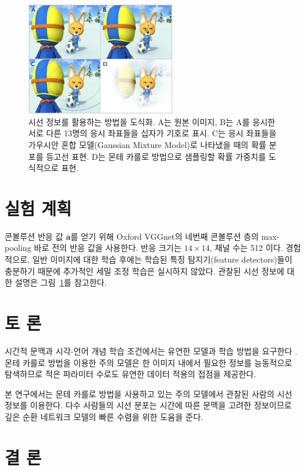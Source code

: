 \documentclass{kcc}
\newcommand{\sa}[0]{\mathbf{a}}
\begin{document}
\begin{figure}
  \centerline{\includegraphics[width=65mm,height=49mm]{eps/sel_fig2.png}}
  \caption{시선 정보를 활용하는 방법을 도식화. A는 원본 이미지, B는 A를 응시한 서로 다른 13명의 응시 좌표들을 십자가 기호로 표시. C는 응시 좌표들을 가우시안 혼합 모델(Gaussian Mixture Model)로 나타냈을 때의 확률 분포를 등고선 표현. D는 몬테 카를로 방법으로 샘플링할 확률 가중치를 도식적으로 표현.}
  \label{fig:selective}
\end{figure}

\section{실험 계획}

콘볼루션 반응 값 $\sa$를 얻기 위해 Oxford VGGnet\cite{Simonyan2014}의 네번째 콘볼루션 층의 max-pooling 바로 전의 반응 값을 사용한다. 반응 크기는 $14 \times 14$, 채널 수는 512 이다. 경험적으로, 일반 이미지에 대한 학습 후에는 학습된 특징 탐지기(feature detectors)들이 충분하기 때문에 추가적인 세밀 조정 학습은 실시하지 않았다. 관찰된 시선 정보에 대한 설명은 그림~\ref{fig:selective}를 참고한다.

\section{토 론}

시간적 문맥과 시각-언어 개념 학습 조건에서는 유연한 모델과 학습 방법을 요구한다 \cite{zhang1994incremental}. 몬테 카를로 방법을 이용한 주의 모델은 한 이미지 내에서 필요한 정보를 능동적으로 탐색하므로 적은 파라미터 수로도 유연한 데이터 적용의 접점을 제공한다.

본 연구에서는 몬테 카를로 방법을 사용하고 있는 주의 모델에서 관찰된 사람의 시선 정보를 이용한다. 다수 사람들의 시선 분포는 시간에 따른 문맥을 고려한 정보이므로 깊은 순환 네트워크 모델의 빠른 수렴을 위한 도움을 준다.

\section{결 론}
\end{document}
